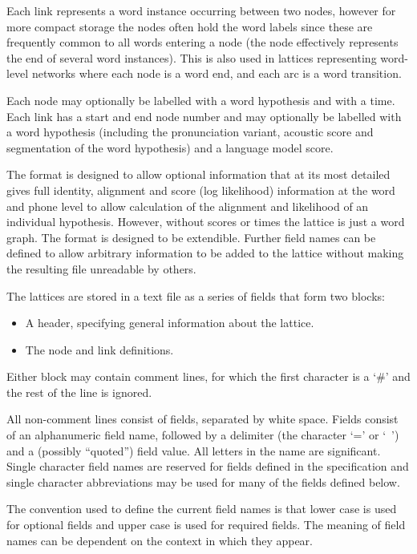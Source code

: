 Each link represents a word instance occurring between 
two nodes, however for more compact storage the nodes often hold the
word labels since these are frequently common to all words entering a
node (the node effectively represents the end of several word instances).
This is also used in lattices representing word-level networks where
each node is a word end, and each arc is a word transition.

Each node may optionally be labelled with a word hypothesis 
and with a time. Each link has a start and end node number 
and may optionally be labelled with a word hypothesis (including the 
pronunciation variant, acoustic score and segmentation of 
the word hypothesis) and a language model score.



The format is designed to allow optional information that at its most
detailed gives full identity, alignment and score (log likelihood) 
information at the word and phone level to allow calculation of the
alignment and likelihood of an individual hypothesis.
However, without scores or times the lattice is just a word graph.
The format is designed to be extendible.  Further field names can be 
defined to allow  arbitrary information to be added to the lattice without
making the resulting file unreadable by others.

The lattices are stored in a text file as a series of fields that 
form two blocks:

\begin{itemize}
\item   A header, specifying general information about the lattice.
\item   The node and link definitions.
\end{itemize}

Either block may contain comment lines, for which the first character 
is a `\#' and the rest of the line is ignored.

All non-comment lines consist of fields, separated by white space.
Fields consist of an alphanumeric field name, followed by a delimiter 
(the character `=' or `~') and a (possibly ``quoted'') field value.  
All letters in the name are significant.  Single character field names
are reserved for fields defined in the specification and single
character abbreviations may be used for many of the fields defined below.

The convention used to define the current field 
names is that lower case
is used for optional fields and upper case is used for required fields.
The meaning of field names can be dependent on the context in which they 
appear.

